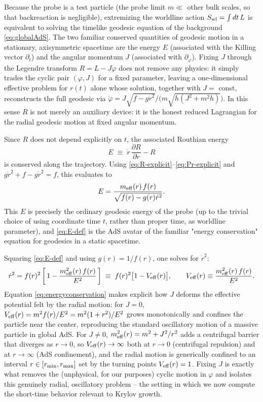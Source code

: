 \documentclass[11pt]{article}
\begin{document}
Because the probe is a test particle (the probe limit $m\ll$ other bulk scales, so that backreaction is negligible), extremizing the worldline action $S_{\rm wl}=\int dt\,L$ is equivalent to solving the timelike geodesic equation of the background \eqref{eq:globalAdS}. The two familiar conserved quantities of geodesic motion in a stationary, axisymmetric spacetime are the energy $E$ (associated with the Killing vector $\partial_t$) and the angular momentum $J$ (associated with $\partial_\varphi$). Fixing $J$ through the Legendre transform $R=L-J\dot\varphi$ does not remove any physics: it simply trades the cyclic pair $(\varphi,J)$ for a fixed parameter, leaving a one-dimensional effective problem for $r(t)$ alone whose solution, together with $J=$ const, reconstructs the full geodesic via $\dot\varphi = J\sqrt{f-g\dot r^2}\big/\big(m\sqrt{h(J^2+m^2h)}\big)$. In this sense $R$ is not merely an auxiliary device: it is the honest reduced Lagrangian for the radial geodesic motion at fixed angular momentum.

Since $R$ does not depend explicitly on $t$, the associated Routhian energy
\begin{equation}
E \;\equiv\; \dot r\,\frac{\partial R}{\partial \dot r} - R
\end{equation}
is conserved along the trajectory. Using \eqref{eq:R-explicit}--\eqref{eq:Pr-explicit} and $g\dot r^2+f-g\dot r^2=f$, this evaluates to
\begin{equation}
E = \frac{m_{\rm eff}(r)\,f(r)}{\sqrt{f(r)-g(r)\dot r^2}} .
\label{eq:E-def}
\end{equation}
This $E$ is precisely the ordinary geodesic energy of the probe (up to the trivial choice of using coordinate time $t$, rather than proper time, as worldline parameter), and \eqref{eq:E-def} is the AdS avatar of the familiar "energy conservation" equation for geodesics in a static spacetime.

Squaring \eqref{eq:E-def} and using $g(r)=1/f(r)$, one solves for $\dot r^2$:
\begin{equation}
\dot r^2 = f(r)^2\left[\,1-\frac{m_{\rm eff}^2(r)\,f(r)}{E^2}\,\right]
\;\equiv\; f(r)^2\big[1-V_{\rm eff}(r)\big],
\qquad
V_{\rm eff}(r) \equiv \frac{m_{\rm eff}^2(r)\,f(r)}{E^2} .
\label{eq:energyconservation}
\end{equation}
Equation \eqref{eq:energyconservation} makes explicit how $J$ deforms the effective potential felt by the radial motion: for $J=0$, $V_{\rm eff}(r)=m^2f(r)/E^2=m^2(1+r^2)/E^2$ grows monotonically and confines the particle near the center, reproducing the standard oscillatory motion of a massive particle in global AdS. For $J\neq0$, $m_{\rm eff}^2(r)=m^2+J^2/r^2$ adds a centrifugal barrier that diverges as $r\to0$, so $V_{\rm eff}(r)\to\infty$ both at $r\to0$ (centrifugal repulsion) and at $r\to\infty$ (AdS confinement), and the radial motion is generically confined to an interval $r\in[r_{\rm min},r_{\rm max}]$ set by the turning points $V_{\rm eff}(r)=1$. Fixing $J$ is exactly what removes the (unphysical, for our purposes) cyclic motion in $\varphi$ and isolates this genuinely radial, oscillatory problem -- the setting in which we now compute the short-time behavior relevant to Krylov growth.
\end{document}
